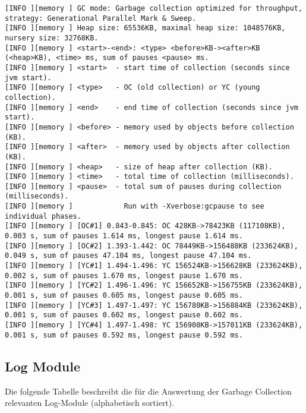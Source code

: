 \begin{landscape}\label{logexample}
\begin{lstlisting}[caption=Garbage Collection Logdatei]
[INFO ][memory ] GC mode: Garbage collection optimized for throughput, strategy: Generational Parallel Mark & Sweep.
[INFO ][memory ] Heap size: 65536KB, maximal heap size: 1048576KB, nursery size: 32768KB.
[INFO ][memory ] <start>-<end>: <type> <before>KB-><after>KB (<heap>KB), <time> ms, sum of pauses <pause> ms.
[INFO ][memory ] <start>  - start time of collection (seconds since jvm start).
[INFO ][memory ] <type>   - OC (old collection) or YC (young collection).
[INFO ][memory ] <end>    - end time of collection (seconds since jvm start).
[INFO ][memory ] <before> - memory used by objects before collection (KB).
[INFO ][memory ] <after>  - memory used by objects after collection (KB).
[INFO ][memory ] <heap>   - size of heap after collection (KB).
[INFO ][memory ] <time>   - total time of collection (milliseconds).
[INFO ][memory ] <pause>  - total sum of pauses during collection (milliseconds).
[INFO ][memory ]            Run with -Xverbose:gcpause to see individual phases.
[INFO ][memory ] [OC#1] 0.843-0.845: OC 428KB->78423KB (117108KB), 0.003 s, sum of pauses 1.614 ms, longest pause 1.614 ms.
[INFO ][memory ] [OC#2] 1.393-1.442: OC 78449KB->156488KB (233624KB), 0.049 s, sum of pauses 47.104 ms, longest pause 47.104 ms.
[INFO ][memory ] [YC#1] 1.494-1.496: YC 156524KB->156628KB (233624KB), 0.002 s, sum of pauses 1.670 ms, longest pause 1.670 ms.
[INFO ][memory ] [YC#2] 1.496-1.496: YC 156652KB->156755KB (233624KB), 0.001 s, sum of pauses 0.605 ms, longest pause 0.605 ms.
[INFO ][memory ] [YC#3] 1.497-1.497: YC 156780KB->156884KB (233624KB), 0.001 s, sum of pauses 0.602 ms, longest pause 0.602 ms.
[INFO ][memory ] [YC#4] 1.497-1.498: YC 156908KB->157011KB (233624KB), 0.001 s, sum of pauses 0.592 ms, longest pause 0.592 ms.
\end{lstlisting}
\end{landscape}

\subsection{Log Module}\label{logmodule}

Die folgende Tabelle beschreibt die für die Auswertung der Garbage Collection relevanten Log-Module (alphabetisch sortiert). 

